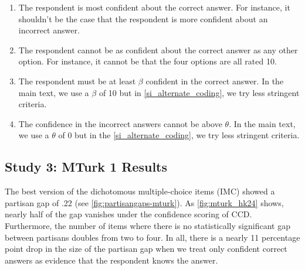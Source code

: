 \documentclass[12pt, letterpaper]{article}
\begin{document}
\begin{enumerate}

  \item The respondent is most confident about the correct answer. For instance, it shouldn't be the case that the respondent is more confident about an incorrect answer.

  \item The respondent cannot be as confident about the correct answer as any other option. For instance, it cannot be that the four options are all rated 10. 

  \item The respondent must be at least $\beta$ confident in the correct answer. In the main text, we use a $\beta$ of 10 but in \cref{si_alternate_coding}, we try less stringent criteria.

  \item The confidence in the incorrect answers cannot be above $\theta$. In the main text, we use a $\theta$ of 0 but in the \cref{si_alternate_coding}, we try less stringent criteria.

\end{enumerate}

\subsection*{Study 3: MTurk 1 Results}

The best version of the dichotomous multiple-choice items (IMC) showed a partisan gap of .22 (see \cref{fig:partisangaps-mturk}). As \cref{fig:mturk_hk24} shows, nearly half of the gap vanishes under the confidence scoring of CCD. Furthermore, the number of items where there is no statistically significant gap between partisans doubles from two to four. In all, there is a nearly 11 percentage point drop in the size of the partisan gap when we treat only confident correct answers as evidence that the respondent knows the answer. 
\end{document}
